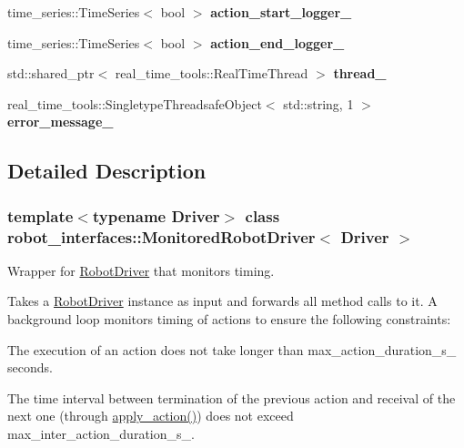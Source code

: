 \begin{DoxyCompactItemize}
\mbox{\label{classrobot__interfaces_1_1MonitoredRobotDriver_a5c02465be067a76143495c47469d0ae3}} 
time\+\_\+series\+::\+Time\+Series$<$ bool $>$ {\bfseries action\+\_\+start\+\_\+logger\+\_\+}
\item 
\mbox{\label{classrobot__interfaces_1_1MonitoredRobotDriver_a469ee1c7ec3565e391c9ac1758b702f6}} 
time\+\_\+series\+::\+Time\+Series$<$ bool $>$ {\bfseries action\+\_\+end\+\_\+logger\+\_\+}
\item 
\mbox{\label{classrobot__interfaces_1_1MonitoredRobotDriver_aaa3c0cd73914d3d3118a78252ed13631}} 
std\+::shared\+\_\+ptr$<$ real\+\_\+time\+\_\+tools\+::\+Real\+Time\+Thread $>$ {\bfseries thread\+\_\+}
\item 
\mbox{\label{classrobot__interfaces_1_1MonitoredRobotDriver_a123c65db418751fccfd681e0cc53348a}} 
real\+\_\+time\+\_\+tools\+::\+Singletype\+Threadsafe\+Object$<$ std\+::string, 1 $>$ {\bfseries error\+\_\+message\+\_\+}
\end{DoxyCompactItemize}


\subsection{Detailed Description}
\subsubsection*{template$<$typename Driver$>$\newline
class robot\+\_\+interfaces\+::\+Monitored\+Robot\+Driver$<$ Driver $>$}

Wrapper for \hyperlink{classrobot__interfaces_1_1RobotDriver}{Robot\+Driver} that monitors timing. 

Takes a \hyperlink{classrobot__interfaces_1_1RobotDriver}{Robot\+Driver} instance as input and forwards all method calls to it. A background loop monitors timing of actions to ensure the following constraints\+:


\begin{DoxyEnumerate}
\item The execution of an action does not take longer than {\ttfamily max\+\_\+action\+\_\+duration\+\_\+s\+\_\+} seconds.
\item The time interval between termination of the previous action and receival of the next one (through {\ttfamily \hyperlink{classrobot__interfaces_1_1MonitoredRobotDriver_a3f0f7cbf74236e91d33dcfc08206b5e9}{apply\+\_\+action()}}) does not exceed {\ttfamily max\+\_\+inter\+\_\+action\+\_\+duration\+\_\+s\+\_\+}.
\end{DoxyEnumerate}

